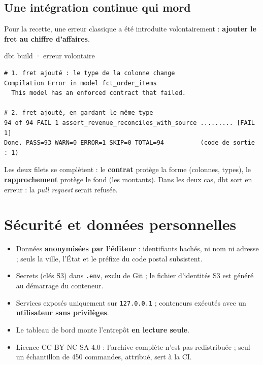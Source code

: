 \documentclass[11pt, a4paper, oneside, headings=normal, numbers=noenddot, DIV=12]{scrartcl}
\begin{document}
\subsection{Une intégration continue qui mord}
Pour la recette, une erreur classique a été introduite volontairement : \textbf{ajouter le fret au chiffre d'affaires}.

\begin{terminal}{dbt build · erreur volontaire}
\begin{lstlisting}[style=terminal]
# 1. fret ajouté : le type de la colonne change
Compilation Error in model fct_order_items
  This model has an enforced contract that failed.

# 2. fret ajouté, en gardant le même type
94 of 94 FAIL 1 assert_revenue_reconciles_with_source ......... [FAIL 1]
Done. PASS=93 WARN=0 ERROR=1 SKIP=0 TOTAL=94          (code de sortie : 1)
\end{lstlisting}
\end{terminal}

Les deux filets se complètent : le \textbf{contrat} protège la forme (colonnes, types), le \textbf{rapprochement} protège le fond (les montants).
Dans les deux cas, dbt sort en erreur : la \emph{pull request} serait refusée.

\section{Sécurité et données personnelles}
\begin{itemize}[leftmargin=1.2em]
  \item Données \textbf{anonymisées par l'éditeur} : identifiants hachés, ni nom ni adresse ; seuls la ville, l'État et le préfixe du code postal subsistent.
  \item Secrets (clés S3) dans \texttt{.env}, exclu de Git ; le fichier d'identités S3 est généré au démarrage du conteneur.
  \item Services exposés uniquement sur \texttt{127.0.0.1} ; conteneurs exécutés avec un \textbf{utilisateur sans privilèges}.
  \item Le tableau de bord monte l'entrepôt \textbf{en lecture seule}.
  \item Licence CC BY-NC-SA 4.0 : l'archive complète n'est pas redistribuée ; seul un échantillon de 450 commandes, attribué, sert à la CI.
\end{itemize}

\end{document}
